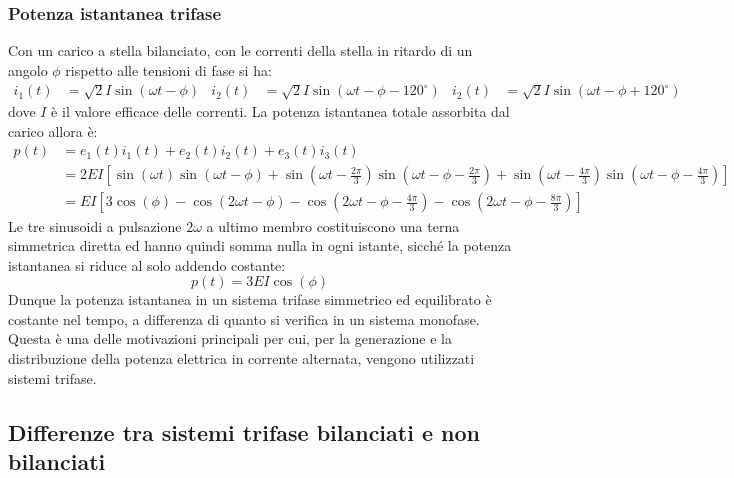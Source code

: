 \documentclass{article}
\begin{document}
\subsubsection{Potenza istantanea trifase}
Con un carico a stella bilanciato, con le correnti della stella in ritardo di un angolo $\phi$ rispetto alle tensioni di fase si ha:
\begin{align*}
    i_1(t) &= \sqrt{2} I \sin\left(\omega t - \phi\right) 
    &
    i_2(t) &= \sqrt{2} I \sin\left(\omega t - \phi - 120^{\circ}\right)
    &
    i_2(t) &= \sqrt{2} I \sin\left(\omega t - \phi + 120^{\circ}\right)
\end{align*}
dove $I$ è il valore efficace delle correnti. La potenza istantanea totale assorbita dal carico allora è:
\begin{align*}
    p(t) &= e_1(t)i_1(t) + e_2(t)i_2(t) + e_3(t)i_3(t)
    \\
    &=2EI \left[\sin(\omega t) \sin(\omega t - \phi)+\sin \left(\omega t - \frac{2 \pi}{3}\right)\sin \left(\omega t - \phi - \frac{2 \pi}{3}\right)+\sin\left(\omega t - \frac{4 \pi}{3}\right)\sin\left(\omega t - \phi - \frac{4 \pi}{3}\right)\right]
    \\
    &= EI \left[3 \cos(\phi) - \cos(2 \omega t - \phi) - \cos \left(2 \omega t - \phi - \frac{4 \pi}{3}\right)-\cos\left(2 \omega t - \phi - \frac{8 \pi}{3}\right)\right]
\end{align*}
Le tre sinusoidi a pulsazione $2 \omega$ a ultimo membro costituiscono una terna simmetrica diretta ed hanno quindi somma nulla in ogni istante, sicché la potenza
istantanea si riduce al solo addendo costante:
\[p(t) = 3 EI \cos(\phi)\]
Dunque la potenza istantanea in un sistema trifase simmetrico ed equilibrato è
costante nel tempo, a differenza di quanto si verifica in un sistema monofase. Questa è una delle motivazioni principali per cui, per la generazione e la distribuzione della potenza elettrica in corrente alternata, vengono utilizzati sistemi trifase.


\subsection{Differenze tra sistemi trifase bilanciati e non bilanciati}
\end{document}
